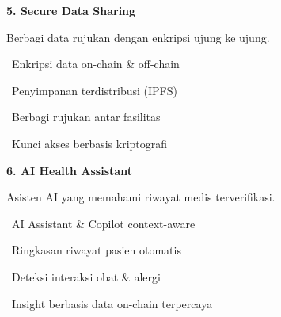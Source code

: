 \documentclass[a4paper]{article}
\begin{document}
\vspace{8pt}

\noindent
\begin{minipage}[t]{0.485\textwidth}
    \colorbox{OrangePrimary}{%
        \begin{minipage}{\dimexpr\textwidth-2\fboxsep\relax}
            {\fontsize{10}{13}\selectfont\bfseries\color{White} 5. Secure Data Sharing}
        \end{minipage}}\par
    \vspace{4pt}
    {\fontsize{9}{12}\selectfont\color{TextDark}%
    Berbagi data rujukan dengan enkripsi ujung ke ujung.\par\vspace{3pt}
    \textbullet\ Enkripsi data on-chain \& off-chain\par\vspace{2pt}%
    \textbullet\ Penyimpanan terdistribusi (IPFS)\par\vspace{2pt}%
    \textbullet\ Berbagi rujukan antar fasilitas\par\vspace{2pt}%
    \textbullet\ Kunci akses berbasis kriptografi}%
\end{minipage}%
\hfill
\begin{minipage}[t]{0.485\textwidth}
    \colorbox{EmeraldDark}{%
        \begin{minipage}{\dimexpr\textwidth-2\fboxsep\relax}
            {\fontsize{10}{13}\selectfont\bfseries\color{White} 6. AI Health Assistant}
        \end{minipage}}\par
    \vspace{4pt}
    {\fontsize{9}{12}\selectfont\color{TextDark}%
    Asisten AI yang memahami riwayat medis terverifikasi.\par\vspace{3pt}
    \textbullet\ AI Assistant \& Copilot context-aware\par\vspace{2pt}%
    \textbullet\ Ringkasan riwayat pasien otomatis\par\vspace{2pt}%
    \textbullet\ Deteksi interaksi obat \& alergi\par\vspace{2pt}%
    \textbullet\ Insight berbasis data on-chain terpercaya}%
\end{minipage}
\end{document}
